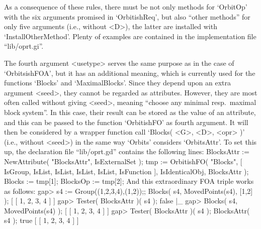 As a  consequence of  these rules, there  must be  not  only methods  for
`OrbitOp' with  the six arguments  promised  in `OrbitishReq',  but  also
``other methods'' for only five arguments (i.e., without <D>), the latter
are installed with `InstallOtherMethod'. Plenty of examples are contained
in the implementation file ``lib/oprt.gi''.

The fourth argument <usetype> serves the  same purpose as  in the case of
`OrbitsishFOA', but it has an additional meaning, which is currently used
for the functions `Blocks' and `MaximalBlocks'. Since they depend upon an
extra argument  <seed>, they cannot be  regarded as  attributes. However,
they are  most often called without  giving  <seed>, meaning ``choose any
minimal resp.\ maximal block system''. In this case,  their result can be
stored   as the value of an   attribute, and this can    be passed to the
function `OrbitishFO' as fourth argument. It will then be considered by a
wrapper function call `Blocks( <G>, <D>, <opr>  )' (i.e., without <seed>)
in the  same  way `Orbits' considers  `OrbitsAttr'. To  set  this up, the
declaration file ``lib/oprt.gd'' contains the following lines:
\begintt
    BlocksAttr := NewAttribute( "BlocksAttr", IsExternalSet );
    tmp := OrbitishFO( "Blocks",
	[ IsGroup, IsList, IsList,
	  IsList,
	  IsList,
	  IsFunction ], IsIdenticalObj, BlocksAttr );
    Blocks   := tmp[1];
    BlocksOp := tmp[2];
\endtt
And this extraordinary FOA triple works as follows:
\beginexample
    gap> s4 := Group((1,2,3,4),(1,2));; Blocks( s4, MovedPoints(s4), [1,2] );
    [ [ 1, 2, 3, 4 ] ]
    gap> Tester( BlocksAttr )( s4 );
    false
|_
    gap> Blocks( s4, MovedPoints(s4) );       
    [ [ 1, 2, 3, 4 ] ]
    gap> Tester( BlocksAttr )( s4 );  BlocksAttr( s4 );
    true
    [ [ 1, 2, 3, 4 ] ]
\endexample

